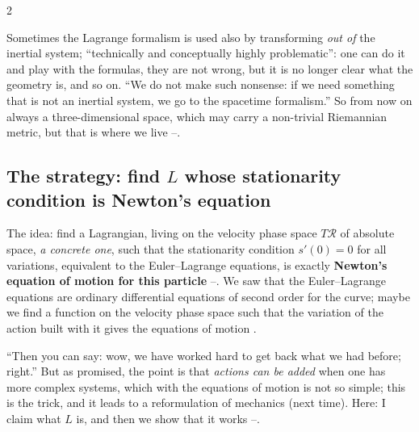 \begin{paracol}{2}
\begin{coursenote}\label{cn:var-noninertial}
Sometimes the Lagrange formalism is used also by transforming \emph{out of} the inertial system; ``technically and conceptually highly problematic'': one can do it and play with the formulas, they are not wrong, but it is no longer clear what the geometry is, and so on. ``We do not make such nonsense: if we need something that is not an inertial system, we go to the spacetime formalism.'' So from now on always a three-dimensional space, which may carry a non-trivial Riemannian metric, but that is where we live --.
\end{coursenote}

\subsection{The strategy: find $L$ whose stationarity condition is Newton's equation}\label{ssec:var-strategy}

The idea: find a Lagrangian, living on the velocity phase space $T\mathcal R$ of absolute space, \emph{a concrete one}, such that the stationarity condition $s'(0)=0$ for all variations, equivalent to the Euler--Lagrange equations, is exactly \textbf{Newton's equation of motion for this particle} --. We saw that the Euler--Lagrange equations are ordinary differential equations of second order for the curve; maybe we find a function on the velocity phase space such that the variation of the action built with it gives the equations of motion .

``Then you can say: wow, we have worked hard to get back what we had before; right.'' But as promised, the point is that \emph{actions can be added} when one has more complex systems, which with the equations of motion is not so simple; this is the trick, and it leads to a reformulation of mechanics (next time). Here: I claim what $L$ is, and then we show that it works --.


\end{paracol}
